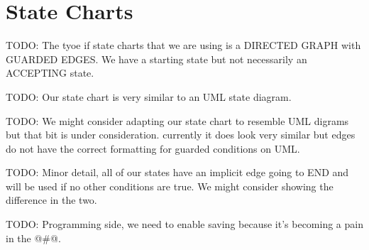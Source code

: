 \section{State Charts}

TODO: The tyoe if state charts that we are using is a DIRECTED GRAPH with GUARDED EDGES. We have a starting state but not necessarily an ACCEPTING state.

TODO: Our state chart is very similar to an UML state diagram.

TODO: We might consider adapting our state chart to resemble UML digrams but that bit is under consideration. currently it does look very similar but edges do not have the correct formatting for guarded conditions on UML.

TODO: Minor detail, all of our states have an implicit edge going to END and will be used if no other conditions are true. We might consider showing the difference in the two.

TODO: Programming side, we need to enable saving because it's becoming a pain in the @#@.
